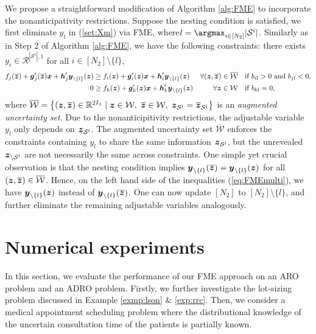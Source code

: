 \documentclass[fleqn,orsc,blindrev]{informs4}
\newcommand{\mb}[1]{\mbox{\boldmath \ensuremath{#1}}}
\begin{document}
	We propose a straightforward modification of Algorithm \ref{alg:FME} to incorporate the nonanticipativity restrictions. Suppose the nesting condition is satisfied, we first eliminate $y_l$ in (\ref{set:Xm}) via FME, where\break $l =\argmax_{i \in [N_2]} |\mathcal{S}^i|$. Similarly as in Step 2 of Algorithm \ref{alg:FME}, we have the following constraints: there exists $y_i \in \mathcal{R}^{|\mathcal{S}^i|,1}$ for all $i\in [N_2]\setminus \{l\}$,
\begin{align}
	f_j(\overline{\mb{z}}) + \mb{g}'_j(\overline{\mb{z}})\mb{x} + \mb{h}'_j \mb{y}_{ \setminus \{l\}}(\mb{z})  & \ge f_i(\mb{z}) + \mb{g}_i'(\mb{z})\mb{x} + \mb{h}'_i \mb{y}_{ \setminus \{l\}}(\mb{z})   & \forall (\mb{z},\overline{\mb{z}}) \in \overline{\mathcal{W}} \quad  &\text{if $b_{il}  >0$ and $b_{jl}  <0 $}, \label{eq:FMEmulti}\\
   	0 & \ge	f_k(\mb{z}) + \mb{g}'_k(\mb{z})\mb{x} + \mb{h}'_k\mb{y}_{ \setminus \{l\}}(\mb{z})  & \forall \mb{z} \in \mathcal{W} \quad  &\text{if $b_{kl} =0$},
\end{align}
   	where $\overline{\mathcal{W}} = \left\{ (\mb{z}, \overline{\mb{z}}) \in \mathbb{R}^{2I_1} \hspace{3pt} | \hspace{3pt}  \mb{z} \in \mathcal{W}, \hspace{3pt}  \overline{\mb{z}} \in \mathcal{W}, \hspace{3pt}  \mb{z}_{\mathcal{S}^l}= \overline{\mb{z}}_{\mathcal{S}^l} \right\}$ is an \textit{augmented uncertainty set}. Due to the nonanticipitivity restrictions, the adjustable variable $y_l$ only depends on $\mb{z}_{\mathcal{S}^l}$. The augmented uncertainty set $\overline{\mathcal{W}} $ enforces  the constraints containing $y_l$ to share the same information $\mb{z}_{\mathcal{S}^l}$, but the unrevealed $\mb{z}_{\setminus \mathcal{S}^l}$ are not necessarily the same across constraints. One simple yet crucial observation is that the nesting condition implies $\mb{y}_{ \setminus \{l\}}(\overline{\mb{z}}) = \mb{y}_{ \setminus \{l\}}(\mb{z})$ for all $(\mb{z},\overline{\mb{z}}) \in \overline{\mathcal{W}}$. Hence, on the left hand side of the inequalities (\ref{eq:FMEmulti}), we have $\mb{y}_{ \setminus \{l\}}(\mb{z})$ instead of $\mb{y}_{ \setminus \{l\}}(\overline{\mb{z}})$. One can now update $[N_2]$ to $[N_2]\setminus\{l\}$, and further eliminate the remaining adjustable variables analogously. 


	\section{Numerical experiments} \label{sec:NE}
		 {In this section, we evaluate the performance of our FME approach on an ARO problem and an ADRO problem. Firstly, we further investigate the lot-sizing problem discussed in Example \ref{exmp:lson} \& \ref{exp:rrc}. Then, we consider a medical appointment scheduling problem where the distributional knowledge of the uncertain consultation time of the patients is partially known.}
\end{document}

